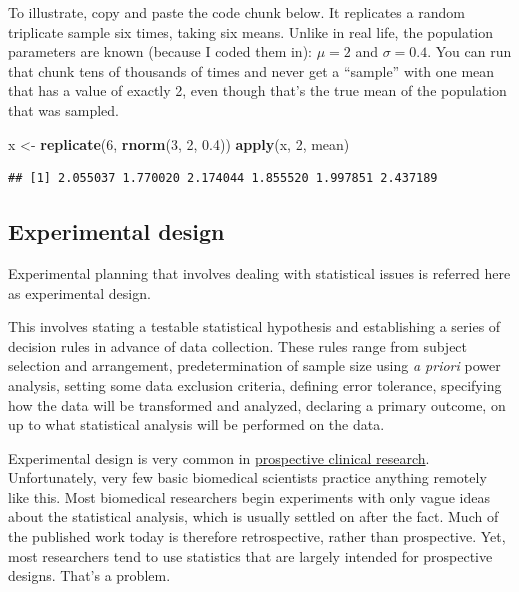 \documentclass[]{book}
\newenvironment{Shaded}{\begin{snugshade}}{\end{snugshade}}
\newcommand{\DecValTok}[1]{\textcolor[rgb]{0.00,0.00,0.81}{#1}}
\newcommand{\FloatTok}[1]{\textcolor[rgb]{0.00,0.00,0.81}{#1}}
\newcommand{\KeywordTok}[1]{\textcolor[rgb]{0.13,0.29,0.53}{\textbf{#1}}}
\newcommand{\NormalTok}[1]{#1}
\newcommand{\StringTok}[1]{\textcolor[rgb]{0.31,0.60,0.02}{#1}}
\begin{document}
To illustrate, copy and paste the code chunk below. It replicates a random triplicate sample six times, taking six means. Unlike in real life, the population parameters are known (because I coded them in): \(\mu=2\) and \(\sigma=0.4\). You can run that chunk tens of thousands of times and never get a ``sample'' with one mean that has a value of exactly 2, even though that's the true mean of the population that was sampled.

\begin{Shaded}
\begin{Highlighting}[]
\NormalTok{x <-}\StringTok{ }\KeywordTok{replicate}\NormalTok{(}\DecValTok{6}\NormalTok{, }\KeywordTok{rnorm}\NormalTok{(}\DecValTok{3}\NormalTok{, }\DecValTok{2}\NormalTok{, }\FloatTok{0.4}\NormalTok{))}
\KeywordTok{apply}\NormalTok{(x, }\DecValTok{2}\NormalTok{, mean)}
\end{Highlighting}
\end{Shaded}

\begin{verbatim}
## [1] 2.055037 1.770020 2.174044 1.855520 1.997851 2.437189
\end{verbatim}

\hypertarget{experimental-design}{%
\subsection{Experimental design}\label{experimental-design}}

Experimental planning that involves dealing with statistical issues is referred here as experimental design.

This involves stating a testable statistical hypothesis and establishing a series of decision rules in advance of data collection. These rules range from subject selection and arrangement, predetermination of sample size using \emph{a priori} power analysis, setting some data exclusion criteria, defining error tolerance, specifying how the data will be transformed and analyzed, declaring a primary outcome, on up to what statistical analysis will be performed on the data.

Experimental design is very common in \href{https://clinicaltrials.gov/ct2/home}{prospective clinical research}. Unfortunately, very few basic biomedical scientists practice anything remotely like this. Most biomedical researchers begin experiments with only vague ideas about the statistical analysis, which is usually settled on after the fact. Much of the published work today is therefore retrospective, rather than prospective. Yet, most researchers tend to use statistics that are largely intended for prospective designs. That's a problem.
\end{document}
